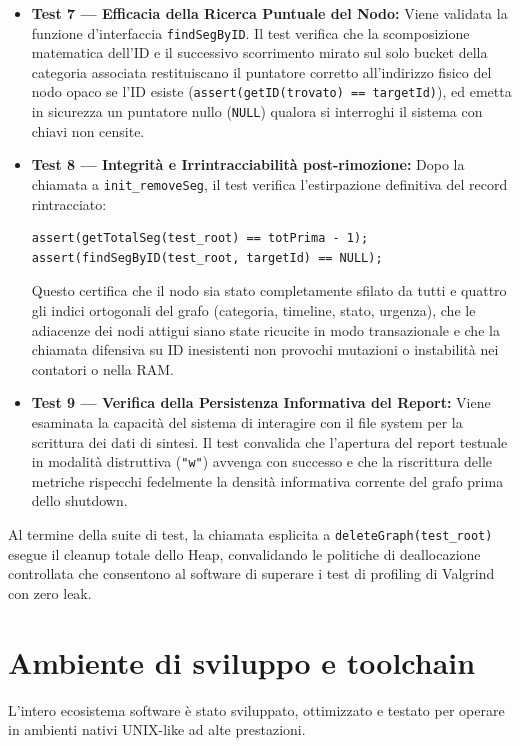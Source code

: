 \documentclass[12pt, a4paper]{article}
\begin{document}
\begin{itemize}[leftmargin=*]
    \item \textbf{Test 7 --- Efficacia della Ricerca Puntuale del Nodo:} Viene validata la funzione d'interfaccia \texttt{findSegByID}. Il test verifica che la scomposizione matematica dell'ID e il successivo scorrimento mirato sul solo bucket della categoria associata restituiscano il puntatore corretto all'indirizzo fisico del nodo opaco se l'ID esiste (\texttt{assert(getID(trovato) == targetId)}), ed emetta in sicurezza un puntatore nullo (\texttt{NULL}) qualora si interroghi il sistema con chiavi non censite.
    
    \item \textbf{Test 8 --- Integrità e Irrintracciabilità post-rimozione:} Dopo la chiamata a \texttt{init\_removeSeg}, il test verifica l'estirpazione definitiva del record rintracciato:
\begin{lstlisting}[style=cstyle, numbers=none]
assert(getTotalSeg(test_root) == totPrima - 1);
assert(findSegByID(test_root, targetId) == NULL);
\end{lstlisting}
    Questo certifica che il nodo sia stato completamente sfilato da tutti e quattro gli indici ortogonali del grafo (categoria, timeline, stato, urgenza), che le adiacenze dei nodi attigui siano state ricucite in modo transazionale e che la chiamata difensiva su ID inesistenti non provochi mutazioni o instabilità nei contatori o nella RAM.
    
    \item \textbf{Test 9 --- Verifica della Persistenza Informativa del Report:} Viene esaminata la capacità del sistema di interagire con il file system per la scrittura dei dati di sintesi. Il test convalida che l'apertura del report testuale in modalità distruttiva (\texttt{"w"}) avvenga con successo e che la riscrittura delle metriche rispecchi fedelmente la densità informativa corrente del grafo prima dello shutdown.
\end{itemize}

Al termine della suite di test, la chiamata esplicita a \texttt{deleteGraph(test\_root)} esegue il cleanup totale dello Heap, convalidando le politiche di deallocazione controllata che consentono al software di superare i test di profiling di Valgrind con zero leak.

\section{Ambiente di sviluppo e toolchain}

L'intero ecosistema software è stato sviluppato, ottimizzato e testato per operare in ambienti nativi UNIX-like ad alte prestazioni.
\end{document}
